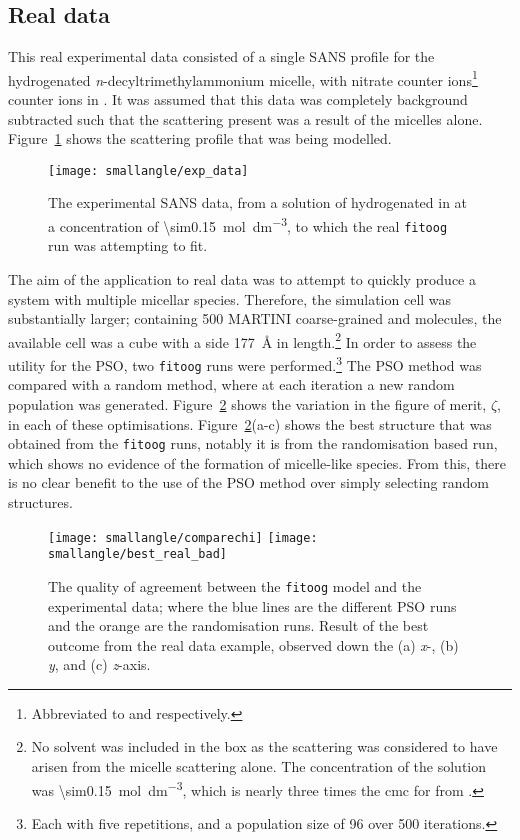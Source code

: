 \subsection{Real data}
\label{sec:real_data}
This real experimental data consisted of a single SANS profile for the hydrogenated \emph{n}-decyltrimethylammonium micelle, with nitrate counter ions\footnote{Abbreviated to  and  respectively.} counter ions in .
It was assumed that this data was completely background subtracted such that the scattering present was a result of the micelles alone.
Figure~\ref{fig:expdata} shows the scattering profile that was being modelled.
%
\begin{figure}[t]
    \centering
    \texttt{[image: smallangle/exp\_data]}
    \caption{The experimental SANS data, from a solution of hydrogenated  in  at a concentration of \SI{\sim0.15}{\mol\deci\meter^{-3}}, to which the real \texttt{fitoog} run was attempting to fit.}
    \label{fig:expdata}
\end{figure}
%

The aim of the application to real data was to attempt to quickly produce a system with multiple micellar species.
Therefore, the simulation cell was substantially larger; containing 500 MARTINI coarse-grained  and  molecules, the available cell was a cube with a side \SI{177}{\angstrom} in length.\footnote{No solvent was included in the box as the scattering was considered to have arisen from the micelle scattering alone. The concentration of the solution was \SI{\sim0.15}{\mol\deci\meter^{-3}}, which is nearly three times the cmc for  from \cite{rodriguez_surface_2007}.}
In order to assess the utility for the PSO, two \texttt{fitoog} runs were performed.\footnote{Each with five repetitions, and a population size of 96 over 500 iterations.}
The PSO method was compared with a random method, where at each iteration a new random population was generated.
Figure~\ref{fig:chi} shows the variation in the figure of merit, $\zeta$, in each of these optimisations.
Figure~\ref{fig:chi}(a-c) shows the best structure that was obtained from the \texttt{fitoog} runs, notably it is from the randomisation based run, which shows no evidence of the formation of micelle-like species.
From this, there is no clear benefit to the use of the PSO method over simply selecting random structures.
%
\begin{figure}
    \centering
    \texttt{[image: smallangle/comparechi]}
    \texttt{[image: smallangle/best\_real\_bad]}
    \caption{The quality of agreement between the \texttt{fitoog} model and the experimental data; where the blue lines are the different PSO runs and the orange are the randomisation runs. Result of the best outcome from the real data example, observed down the (a) \emph{x}-, (b) \emph{y}, and (c) \emph{z}-axis.}
    \label{fig:chi}
\end{figure}
%

